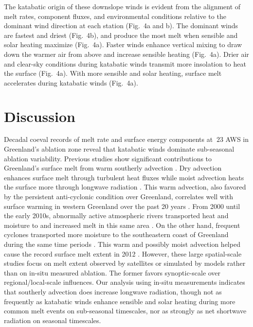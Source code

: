 \documentclass[draft]{agujournal2019}
\begin{document}
The katabatic origin of these downslope winds is evident 
from the alignment of melt rates, component fluxes, 
and environmental conditions relative to 
the dominant wind direction at each station (Fig.~4a and b).
The dominant winds are fastest and driest (Fig.~4b), 
and produce the most melt when sensible and solar heating maximize (Fig.~4a).
Faster winds enhance vertical mixing to draw down the warmer air from above 
and increase sensible heating 
\cite{Parish1989, VandenBroeke2009a, KuipersMunneke2018} (Fig.~4a). 
Drier air and clear-sky conditions 
during katabatic winds transmit more insolation to heat the surface (Fig.~4a).
With more sensible and solar heating, 
surface melt accelerates during katabatic winds (Fig.~4a). 


\section{Discussion}
Decadal coeval records of melt rate and surface energy components 
at $~23$ AWS in Greenland's ablation zone reveal that 
katabatic winds dominate sub-seasonal ablation variability. 
Previous studies show significant contributions to 
Greenland's surface melt from warm southerly advection
\cite{Hanna2013, Neff2014, Mattingly2018, Oltmanns2019}.
Dry advection enhances surface melt through turbulent heat fluxes 
while moist advection heats the surface more through 
longwave radiation \cite{Tjernstrom2019}.
This warm advection, also favored by the persistent 
anti-cyclonic condition over Greenland, 
correlates well with surface warming 
in western Greenland over the past 20 years \cite{Hanna2013}. 
From 2000 until the early 2010s, 
abnormally active atmospheric rivers transported heat and moisture to 
and increased melt in this same area \cite{Mattingly2018}. 
On the other hand, frequent cyclones transported more moisture 
to the southeastern coast of Greenland 
during the same time periods \cite{Edwards-Opperman2018, Oltmanns2019}. 
This warm and possibly moist advection helped 
cause the record surface melt extent in 2012
\cite{Tedesco2013, Hanna2014, Neff2014}.
However, these large spatial-scale studies focus on 
melt extent observed by satellites or 
simulated by models rather than on in-situ measured ablation. 
The former favors synoptic-scale over regional/local-scale influences. 
Our analysis using in-situ measurements indicates that 
southerly advection does increase longwave radiation, 
though not as frequently as katabatic winds 
enhance sensible and solar heating 
during more common melt events on sub-seasonal timescales, 
nor as strongly as net shortwave radiation on seasonal timescales.
\end{document}
